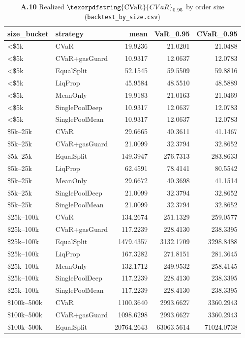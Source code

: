 \documentclass[11pt,a4paper]{article}
\theoremstyle{remark}
\newcommand{\cvar}{\texorpdfstring{\ensuremath{\mathrm{CVaR}}}{CVaR}}
\newcommand{\code}[1]{\texttt{#1}}
\begin{document}
\begin{landscape}
\begin{table}[H]
\centering
\caption*{\textbf{A.10} Realized $\cvar_{0.95}$ by order size
(\code{backtest\_by\_size.csv})}
\scriptsize
\begin{tabular}{@{}llrrr@{}}
\toprule
size\_bucket & strategy & mean & VaR\_0.95 & CVaR\_0.95 \\
\midrule
<\$5k & CVaR & 19.9236 & 21.0201 & 21.0488 \\
<\$5k & CVaR+gasGuard & 10.9317 & 12.0637 & 12.0783 \\
<\$5k & EqualSplit & 52.1545 & 59.5509 & 59.8816 \\
<\$5k & LiqProp & 45.9584 & 48.5510 & 48.5889 \\
<\$5k & MeanOnly & 19.9183 & 21.0163 & 21.0469 \\
<\$5k & SinglePoolDeep & 10.9317 & 12.0637 & 12.0783 \\
<\$5k & SinglePoolMean & 10.9317 & 12.0637 & 12.0783 \\
\$5k--25k & CVaR & 29.6665 & 40.3611 & 41.1467 \\
\$5k--25k & CVaR+gasGuard & 21.0099 & 32.3794 & 32.8652 \\
\$5k--25k & EqualSplit & 149.3947 & 276.7313 & 283.8633 \\
\$5k--25k & LiqProp & 62.4591 & 78.4141 & 80.5542 \\
\$5k--25k & MeanOnly & 29.6672 & 40.3698 & 41.1514 \\
\$5k--25k & SinglePoolDeep & 21.0099 & 32.3794 & 32.8652 \\
\$5k--25k & SinglePoolMean & 21.0099 & 32.3794 & 32.8652 \\
\$25k--100k & CVaR & 134.2674 & 251.1329 & 259.0577 \\
\$25k--100k & CVaR+gasGuard & 117.2239 & 228.4130 & 238.3395 \\
\$25k--100k & EqualSplit & 1479.4357 & 3132.1709 & 3298.8488 \\
\$25k--100k & LiqProp & 167.3282 & 271.8151 & 281.3645 \\
\$25k--100k & MeanOnly & 132.1712 & 249.9532 & 258.4145 \\
\$25k--100k & SinglePoolDeep & 117.2239 & 228.4130 & 238.3395 \\
\$25k--100k & SinglePoolMean & 117.2239 & 228.4130 & 238.3395 \\
\$100k--500k & CVaR & 1100.3640 & 2993.6627 & 3360.2943 \\
\$100k--500k & CVaR+gasGuard & 1098.6298 & 2993.6627 & 3360.2943 \\
\$100k--500k & EqualSplit & 20764.2643 & 63063.5614 & 71024.0738 \\

\end{tabular}
\end{table}
\end{landscape}
\end{document}

